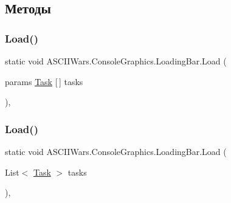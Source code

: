 \subsection{Методы}
\hypertarget{class_a_s_c_i_i_wars_1_1_console_graphics_1_1_loading_bar_a573cfd9dc72c4277e97c5fe2f358c3dd}{}\label{class_a_s_c_i_i_wars_1_1_console_graphics_1_1_loading_bar_a573cfd9dc72c4277e97c5fe2f358c3dd} 
\subsubsection{\texorpdfstring{Load()}{Load()}\hspace{0.1cm}{\footnotesize\ttfamily [1/2]}}
{\footnotesize\ttfamily static void A\+S\+C\+I\+I\+Wars.\+Console\+Graphics.\+Loading\+Bar.\+Load (\begin{DoxyParamCaption}\item[{params \hyperlink{class_a_s_c_i_i_wars_1_1_console_graphics_1_1_task}{Task} \mbox{[}$\,$\mbox{]}}]{tasks }\end{DoxyParamCaption})\hspace{0.3cm}{\ttfamily [inline]}, {\ttfamily [static]}}

\hypertarget{class_a_s_c_i_i_wars_1_1_console_graphics_1_1_loading_bar_a45b8be22b39aee7e47e9d6669670dd7d}{}\label{class_a_s_c_i_i_wars_1_1_console_graphics_1_1_loading_bar_a45b8be22b39aee7e47e9d6669670dd7d} 
\subsubsection{\texorpdfstring{Load()}{Load()}\hspace{0.1cm}{\footnotesize\ttfamily [2/2]}}
{\footnotesize\ttfamily static void A\+S\+C\+I\+I\+Wars.\+Console\+Graphics.\+Loading\+Bar.\+Load (\begin{DoxyParamCaption}\item[{List$<$ \hyperlink{class_a_s_c_i_i_wars_1_1_console_graphics_1_1_task}{Task} $>$}]{tasks }\end{DoxyParamCaption})\hspace{0.3cm}{\ttfamily [inline]}, {\ttfamily [static]}}

